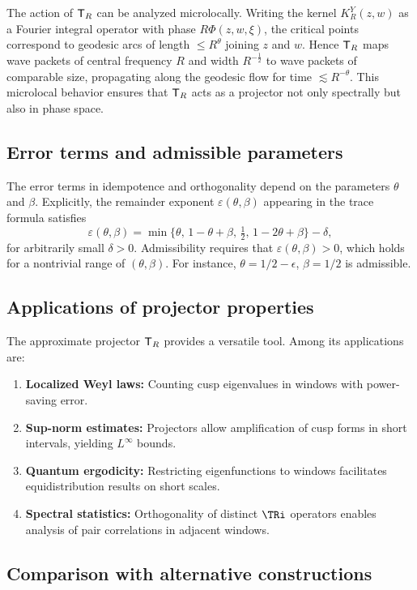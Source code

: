 The action of $\mathsf{T}_R$ can be analyzed microlocally. Writing the kernel $K_R^Y(z,w)$ as a Fourier integral operator with phase $R\Phi(z,w,\xi)$, the critical points correspond to geodesic arcs of length $\le R^\theta$ joining $z$ and $w$. Hence $\mathsf{T}_R$ maps wave packets of central frequency $R$ and width $R^{-\tfrac12}$ to wave packets of comparable size, propagating along the geodesic flow for time $\lesssim R^{-\theta}$. This microlocal behavior ensures that $\mathsf{T}_R$ acts as a projector not only spectrally but also in phase space.

\subsection{Error terms and admissible parameters}\label{subsec:proj-errors}

The error terms in idempotence and orthogonality depend on the parameters $\theta$ and $\beta$. Explicitly, the remainder exponent $\varepsilon(\theta,\beta)$ appearing in the trace formula satisfies
\[
\varepsilon(\theta,\beta) = \min\{\theta,\,1-\theta+\beta,\,\tfrac12,\,1-2\theta+\beta\} - \delta,
\]
for arbitrarily small $\delta>0$. Admissibility requires that $\varepsilon(\theta,\beta)>0$, which holds for a nontrivial range of $(\theta,\beta)$. For instance, $\theta=1/2-\epsilon$, $\beta=1/2$ is admissible.

\subsection{Applications of projector properties}\label{subsec:proj-applications}

The approximate projector $\mathsf{T}_R$ provides a versatile tool. Among its applications are:
\begin{enumerate}
\item \textbf{Localized Weyl laws:} Counting cusp eigenvalues in windows with power-saving error.
\item \textbf{Sup-norm estimates:} Projectors allow amplification of cusp forms in short intervals, yielding $L^\infty$ bounds.
\item \textbf{Quantum ergodicity:} Restricting eigenfunctions to windows facilitates equidistribution results on short scales.
\item \textbf{Spectral statistics:} Orthogonality of distinct $\TRi$ operators enables analysis of pair correlations in adjacent windows.
\end{enumerate}

\subsection{Comparison with alternative constructions}\label{subsec:proj-comparison}


